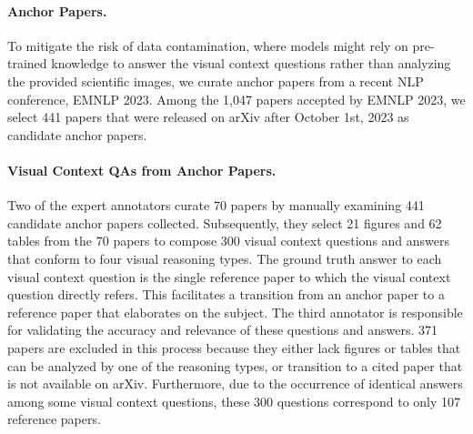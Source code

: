 \paragraph{Anchor Papers.} 
%
To mitigate the risk of data contamination, where models might rely on pre-trained knowledge to answer the visual context questions rather than analyzing the provided scientific images, we curate anchor papers from a recent NLP conference, EMNLP 2023. 
%
Among the 1,047 papers accepted by EMNLP 2023, we select 441 papers that were released on arXiv after October 1st, 2023 as candidate anchor papers. 

\paragraph{Visual Context QAs from Anchor Papers.} 
%
Two of the expert annotators curate 70 papers by manually examining 441 candidate anchor papers collected. Subsequently, they select 21 figures and 62 tables from the 70 papers to compose 300 visual context questions and answers that conform to four visual reasoning types.
%
The ground truth answer to each visual context question is the single reference paper to which the visual context question directly refers.
%
This facilitates a transition from an anchor paper to a reference paper that elaborates on the subject.
%
The third annotator is responsible for validating the accuracy and relevance of these questions and answers.
%
371 papers are excluded in this process because they either lack figures or tables that can be analyzed by one of the reasoning types, or transition to a cited paper that is not available on arXiv.
%
Furthermore, due to the occurrence of identical answers among some visual context questions, these 300 questions correspond to only 107 reference papers.




